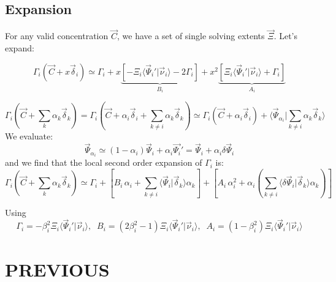\documentclass[aps,12pt]{revtex4}
\begin{document}
\subsection{Expansion}

For any valid concentration $\vec{C}$, we have a set of single solving extents $\vec{\Xi}$.
Let's expand:

\begin{equation}
	\Gamma_i(\vec{C} + x \vec{\delta}_i) \simeq \Gamma_i 
	+ x \underbrace{\left[ -\Xi_i \langle \vec{\Psi}_i' \vert \vec{\nu}_i \rangle - 2 \Gamma_i \right]}_{B_i}
	+ x^2 \underbrace{\left[ \Xi_i \langle \vec{\Psi}_i' \vert \vec{\nu}_i \rangle + \Gamma_i\right]}_{A_i}
\end{equation}

\begin{equation}
	\Gamma_i(\vec{C} + \sum_k \alpha_k \vec{\delta}_k ) 
	=
	\Gamma_i \left(\vec{C} + \alpha_i \vec{\delta}_i + \sum_{k\not=i} \alpha_k \vec{\delta}_k \right)
	\simeq
	\Gamma_i(\vec{C}+\alpha_i \vec{\delta}_i) + \langle \vec{\Psi}_{\alpha_i} \vert \sum_{k\not=i} \alpha_k \vec{\delta}_k \rangle
\end{equation}
We evaluate:
\begin{equation}
	\vec{\Psi}_{\alpha_i} \simeq (1-\alpha_i) \vec{\Psi}_i + \alpha_i \vec{\Psi_i}' = \vec{\Psi}_i + \alpha_i \delta\vec{\Psi}_i
\end{equation}
and we find that the local second order expansion of $\Gamma_i$ is:
\begin{equation}
	\Gamma_i(\vec{C} + \sum_k \alpha_k \vec{\delta}_k ) 
	\simeq
	\Gamma_i +
	\left[ 
	 B_i \, \alpha_i + \sum_{k\not=i} \langle \vec{\Psi}_i \vert \vec{\delta}_k \rangle \alpha_k
	\right]
	+ \left[ A_i \, \alpha_i^2 + \alpha_i \left( \sum_{k\not=i} \langle \delta\vec{\Psi}_i \vert \vec{\delta}_k \rangle \alpha_k \right) \right]
\end{equation}

Using 
\begin{equation}
	\Gamma_i = -\beta_i^2 \Xi_i \langle \vec{\Psi}_i' \vert \vec{\nu}_i \rangle,
	\;\;B_i = (2\beta_i^2-1) \Xi_i \langle \vec{\Psi}_i' \vert \vec{\nu}_i \rangle,
	\;\;A_i = (1-\beta_i^2) \Xi_i \langle \vec{\Psi}_i' \vert \vec{\nu}_i \rangle
\end{equation}



\section{PREVIOUS}
\end{document}
